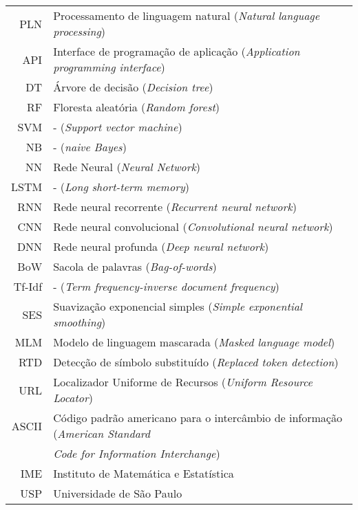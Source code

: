 

\begin{tabular}{rl}
PLN & Processamento de linguagem natural (\emph{Natural language processing})
\\
API & Interface de programação de aplicação (\emph{Application programming
interface}) \\
DT & Árvore de decisão (\emph{Decision tree}) \\
RF & Floresta aleatória (\emph{Random forest}) \\
SVM & - (\emph{Support vector machine}) \\
NB & - (\emph{naive Bayes}) \\
NN & Rede Neural (\emph{Neural Network}) \\
LSTM & - (\emph{Long short-term memory}) \\
RNN & Rede neural recorrente (\emph{Recurrent neural network}) \\
CNN & Rede neural convolucional (\emph{Convolutional neural network}) \\
DNN & Rede neural profunda (\emph{Deep neural network}) \\
BoW & Sacola de palavras (\emph{Bag-of-words}) \\
Tf-Idf & - (\emph{Term frequency-inverse document frequency}) \\
SES & Suavização exponencial simples (\emph{Simple exponential smoothing}) \\
MLM & Modelo de linguagem mascarada (\emph{Masked language model}) \\
RTD & Detecção de símbolo substituído (\emph{Replaced token detection}) \\
URL & Localizador Uniforme de Recursos (\emph{Uniform Resource Locator})\\
ASCII & Código padrão americano para o intercâmbio de informação (\emph{American
Standard} \\
      & \emph{Code for Information Interchange}) \\
IME & Instituto de Matemática e Estatística \\
USP & Universidade de São Paulo
\end{tabular}

